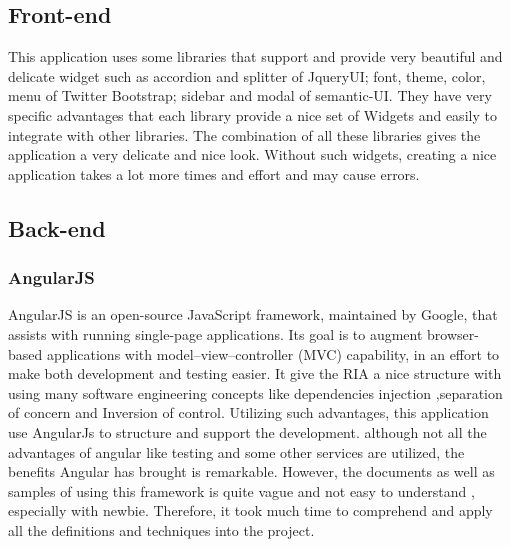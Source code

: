 \documentclass[14pt,a4paper]{extreport}
\begin{document}
		\subsection{Front-end}
			This application uses some libraries that support and provide very beautiful and delicate widget such as accordion and splitter of JqueryUI; font, theme, color, menu of Twitter Bootstrap; sidebar and modal of semantic-UI. They have very specific advantages that each library provide a nice set of Widgets and easily to integrate with other libraries. The combination of all these libraries gives the application a very delicate and nice look. Without such widgets, creating a nice application takes a lot more times and effort and may cause errors.
		
		\subsection{Back-end}
			\subsubsection{AngularJS}
				AngularJS is an open-source JavaScript framework, maintained by Google, that assists with running single-page applications. Its goal is to augment browser-based applications with model–view–controller (MVC) capability, in an effort to make both development and testing easier. It give the RIA a nice structure with using many software engineering concepts like dependencies injection ,separation of concern and Inversion of control. 
				Utilizing such advantages, this application use AngularJs to structure and support the development. although not  all the advantages of angular like testing and some other services are utilized, the benefits Angular has brought is remarkable. However, the documents as well as samples of using this framework is quite vague and not easy to understand , especially with newbie. Therefore, it took much time to comprehend and apply all the definitions and techniques into the project.
\end{document}
